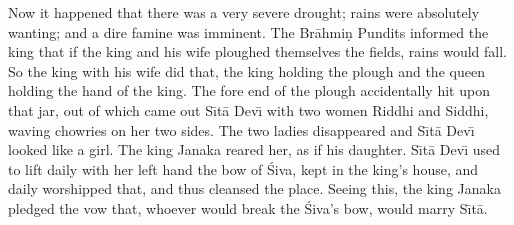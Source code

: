 Now it happened that there was a very severe drought; rains were absolutely wanting; and a dire famine was imminent. The Br\=ahmi\d{n} Pundits informed the king that if the king and his wife ploughed themselves the fields, rains would fall. So the king with his wife did that, the king holding the plough and the queen holding the hand of the king. The fore end of the plough accidentally hit upon that jar, out of which came out S\={\i}t\=a Dev\={\i} with two women Riddhi and Siddhi, waving chowries on her two sides. The two ladies disappeared and S\={\i}t\=a Dev\={\i} looked like a girl. The king Janaka reared her, as if his daughter. S\={\i}t\=a Dev\={\i} used to lift daily with her left hand the bow of \'Siva, kept in the king's house, and daily worshipped that, and thus cleansed the place. Seeing this, the king Janaka pledged the vow that, whoever would break the \'Siva's bow, would marry S\={\i}t\=a.



